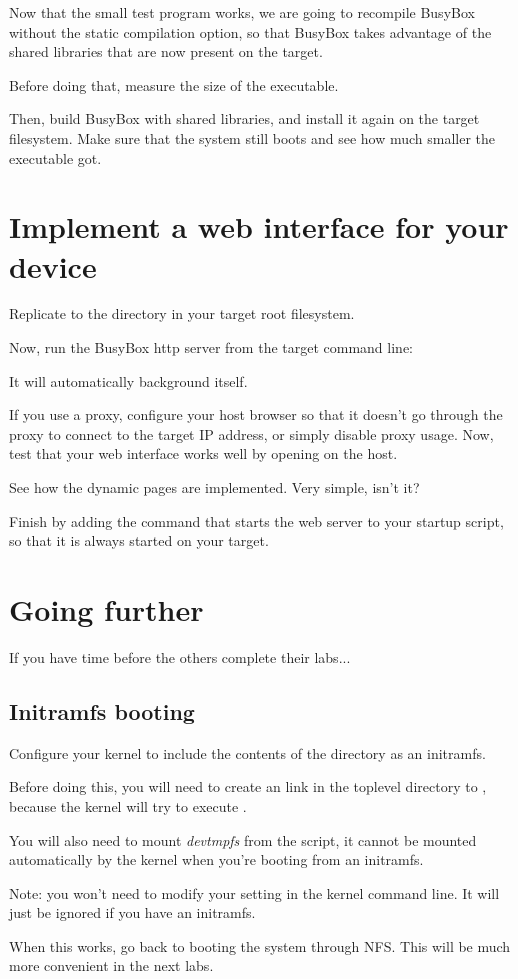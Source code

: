 Now that the small test program works, we are going to recompile BusyBox
without the static compilation option, so that BusyBox takes
advantage of the shared libraries that are now present on the target.

Before doing that, measure the size of the  executable.

Then, build BusyBox with shared libraries, and install it again on the
target filesystem. Make sure that the system still boots and see how
much smaller the  executable got.

\section{Implement a web interface for your device}

Replicate  to the  directory in your target
root filesystem.

Now, run the BusyBox http server from the target command line:


It will automatically background itself.

If you use a proxy, configure your host browser so that it doesn't go
through the proxy to connect to the target IP address, or simply
disable proxy usage.  Now, test that your web interface works well by
opening  on the host.

See how the dynamic pages are implemented. Very simple, isn't it?

Finish by adding the command that starts the web server to your
startup script, so that it is always started on your target.

\section{Going further}

If you have time before the others complete their labs...

\subsection{Initramfs booting}

Configure your kernel to include the contents of the 
directory as an initramfs.

Before doing this, you will need to create an  link in the
toplevel directory to , because the kernel will try to
execute .

You will also need to mount {\em devtmpfs} from the  script,
it cannot be mounted automatically by the kernel when you're booting
from an initramfs.

Note: you won't need to modify your  setting in the kernel
command line. It will just be ignored if you have an initramfs.

When this works, go back to booting the system through NFS.
This will be much more convenient in the next labs.
